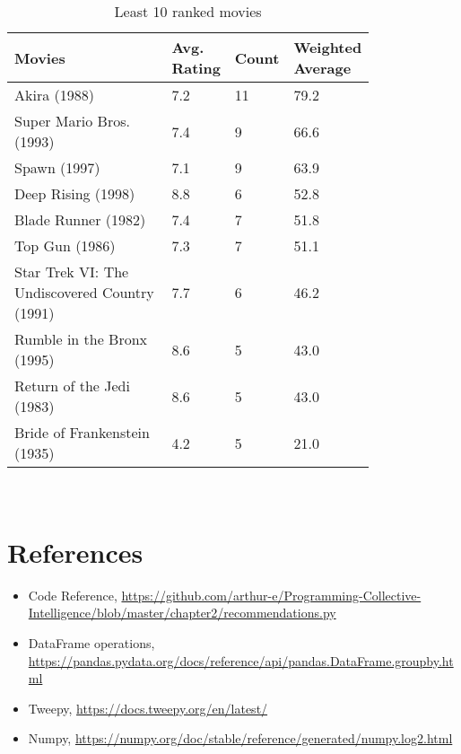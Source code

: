 \documentclass[12pt]{article}
\begin{document}
\begin{table}[h]
\centering
\caption{Least 10 ranked movies}
\label{tbl:simple}
\begin{tabular}{p{0.50\linewidth}p{0.10\linewidth}p{0.10\linewidth}p{0.10\linewidth}}
\hline
\textbf{Movies} & \textbf{Avg. Rating} & \textbf{Count} & \textbf{Weighted Average} \\ \hline \hline
                                 Akira (1988)   &      7.2  &       11  &           79.2   \\ \hline
                     Super Mario Bros. (1993)   &      7.4  &        9  &           66.6   \\ \hline
                                 Spawn (1997)   &      7.1  &        9  &           63.9   \\ \hline
                           Deep Rising (1998)   &      8.8  &        6  &           52.8   \\ \hline
                          Blade Runner (1982)   &      7.4  &        7  &           51.8   \\ \hline
                               Top Gun (1986)   &      7.3  &        7  &           51.1   \\ \hline
Star Trek VI: The Undiscovered Country (1991)   &      7.7  &        6  &           46.2   \\ \hline
                   Rumble in the Bronx (1995)   &      8.6  &        5  &           43.0   \\ \hline
                    Return of the Jedi (1983)   &      8.6  &        5  &           43.0   \\ \hline
                 Bride of Frankenstein (1935)   &      4.2  &        5  &           21.0   \\ \hline \hline
\end{tabular}
\end{table}
\\


\clearpage
\section*{References}



\begin{itemize}
    \item {Code Reference, \url{https://github.com/arthur-e/Programming-Collective-Intelligence/blob/master/chapter2/recommendations.py}}
    \item {DataFrame operations, \url{https://pandas.pydata.org/docs/reference/api/pandas.DataFrame.groupby.html}}
    \item {Tweepy, \url{https://docs.tweepy.org/en/latest/}}
    \item {Numpy, \url{https://numpy.org/doc/stable/reference/generated/numpy.log2.html}}
\end{itemize}
\end{document}
